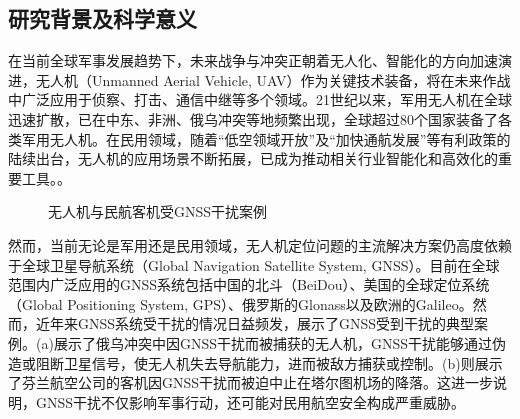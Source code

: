 \documentclass[12pt]{article}
\begin{document}
\subsection{研究背景及科学意义}
在当前全球军事发展趋势下，未来战争与冲突正朝着无人化、智能化的方向加速演进，无人机（Unmanned Aerial Vehicle, UAV）作为关键技术装备，将在未来作战中广泛应用于侦察、打击、通信中继等多个领域。21世纪以来，军用无人机在全球迅速扩散，已在中东、非洲、俄乌冲突等地频繁出现，全球超过80个国家装备了各类军用无人机。在民用领域，随着“低空领域开放”及“加快通航发展”等有利政策的陆续出台，无人机的应用场景不断拓展，已成为推动相关行业智能化和高效化的重要工具。\cite{HKKX201302005}。

\begin{figure}[b]
	\centering
	 \hfill
	\caption{无人机与民航客机受GNSS干扰案例}
	\label{无人机GNSS欺骗案例}
\end{figure}

然而，当前无论是军用还是民用领域，无人机定位问题的主流解决方案仍高度依赖于全球卫星导航系统（Global Navigation Satellite System, GNSS）。目前在全球范围内广泛应用的GNSS系统包括中国的北斗（BeiDou）、美国的全球定位系统（Global Positioning System, GPS）、俄罗斯的Glonass以及欧洲的Galileo。然而，近年来GNSS系统受干扰的情况日益频发\cite{ZGHT201507010}，展示了GNSS受到干扰的典型案例。(a)展示了俄乌冲突中因GNSS干扰而被捕获的无人机，GNSS干扰能够通过伪造或阻断卫星信号，使无人机失去导航能力，进而被敌方捕获或控制。(b)则展示了芬兰航空公司的客机因GNSS干扰而被迫中止在塔尔图机场的降落。这进一步说明，GNSS干扰不仅影响军事行动，还可能对民用航空安全构成严重威胁。
\end{document}

